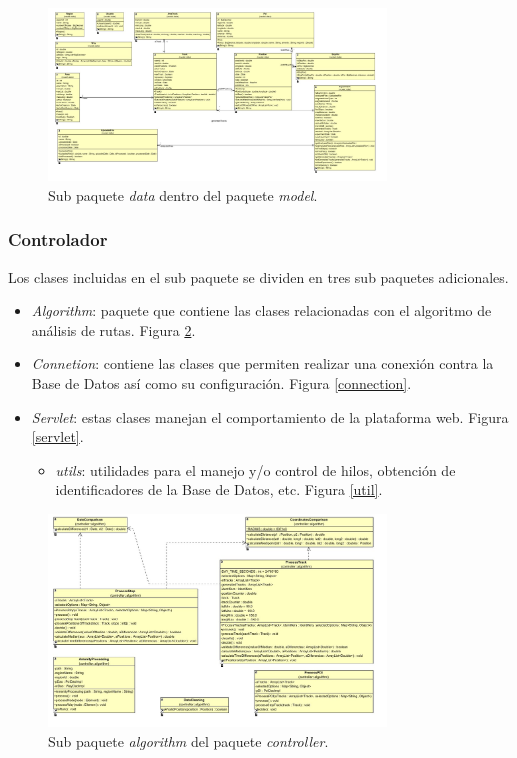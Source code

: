\begin{figure}[!htbp]
  \centering
    \includegraphics[width=0.8\textwidth]{../img/diagramas/model/data/uno.jpg}
  \caption{Sub paquete \textit{data} dentro del paquete \textit{model}.}
  \label{data}
\end{figure}


\subsubsection{Controlador}
Los clases incluidas en el sub paquete  se dividen en tres sub paquetes adicionales.

\begin{itemize}
	\item \textit{Algorithm}: paquete que contiene las clases relacionadas con el algoritmo de análisis de rutas. Figura \ref{algorithm}.
	\item \textit{Connetion}: contiene las clases que permiten realizar una conexión contra la Base de Datos así como su configuración. Figura \ref{connection}.
	\item \textit{Servlet}: estas clases manejan el comportamiento de la plataforma web. Figura \ref{servlet}.
		\begin{itemize}
			\item \textit{utils}: utilidades para el manejo y/o control de hilos, obtención de identificadores de la Base de Datos, etc. Figura \ref{util}.
		\end{itemize}
\end{itemize}

\begin{figure}[!htbp]
  \centering
    \includegraphics[width=0.8\textwidth]{../img/diagramas/controller/algoritmo/uno.jpg}
  \caption{Sub paquete \textit{algorithm} del paquete \textit{controller}.}
  \label{algorithm}
\end{figure}

